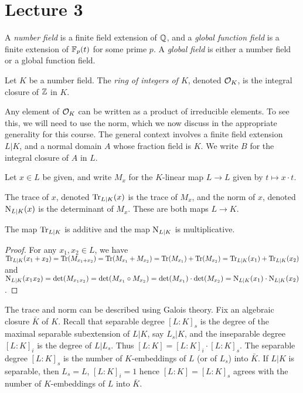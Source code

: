 \section{Lecture 3}

\begin{definition}
  A \emph{number field} is a finite field extension of $\mathbb{Q}$, and a \emph{global function field} is a finite extension of $\mathbb{F}_{p}(t)$ for some prime $p$.
  A \emph{global field} is either a number field or a global function field.
\end{definition}

\begin{definition}
  Let $K$ be a number field.
  The \emph{ring of integers of $K$}, denoted $\mathcal{O}_{K}$, is the integral closure of $\mathbb{Z}$ in $K$.
\end{definition}

Any element of $\mathcal{O}_{K}$ can be written as a product of irreducible elements.
To see this, we will need to use the norm, which we now discuss in the appropriate generality for this course.
The general context involves a finite field extension $L|K$, and a normal domain $A$ whose fraction field is $K$.
We write $B$ for the integral closure of $A$ in $L$.

Let $x \in L$ be given, and write $M_{x}$ for the $K$-linear map $L \to L$ given by $t \mapsto x \cdot t$.
\begin{definition}
  The trace of $x$, denoted $\operatorname{Tr}_{L|K}(x)$ is the trace of $M_{x}$, and the norm of $x$, denoted $\operatorname{N}_{L|K}(x)$ is the determinant of $M_{x}$.
  These are both maps $L \to K$.
\end{definition}

\begin{lemma}
  The map $\operatorname{Tr}_{L|K}$ is additive and the map $\operatorname{N}_{L|K}$ is multiplicative.
\end{lemma}
\begin{proof}
  For any $x_1, x_2\in L$, we have $\operatorname{Tr}_{L|K}(x_1 + x_2) = \operatorname{Tr}(M_{x_1 + x_2}) = \operatorname{Tr}(M_{x_1} + M_{x_2}) = \operatorname{Tr}(M_{x_1}) + \operatorname{Tr}(M_{x_2}) = \operatorname{Tr}_{L|K}(x_1) + \operatorname{Tr}_{L|K}(x_2)$ and $\operatorname{N}_{L|K}(x_1x_2) = \det(M_{x_1x_2}) = \det(M_{x_1} \circ M_{x_2}) = \det(M_{x_1})\cdot \det(M_{x_2}) = \operatorname{N}_{L|K}(x_1)\cdot \operatorname{N}_{L|K}(x_2)$.
\end{proof}

The trace and norm can be described using Galois theory.
Fix an algebraic closure $\bar K$ of $K$.
Recall that separable degree $[L:K]_{s}$ is the degree of the maximal separable subextension of $L|K$, say $L_{s}|K$, and the inseparable degree $[L:K]_{i}$ is the degree of $L|L_{s}$.
Thus $[L:K] = [L:K]_{i} \cdot [L:K]_{s}$.
The separable degree $[L:K]_{s}$ is the number of $K$-embeddings of $L$ (or of $L_{s}$) into $\bar K$.
If $L|K$ is separable, then $L_{s} = L$, $[L:K]_{i} = 1$ hence $[L:K] = [L:K]_{s}$ agrees with the number of $K$-embeddings of $L$ into $\bar K$.

